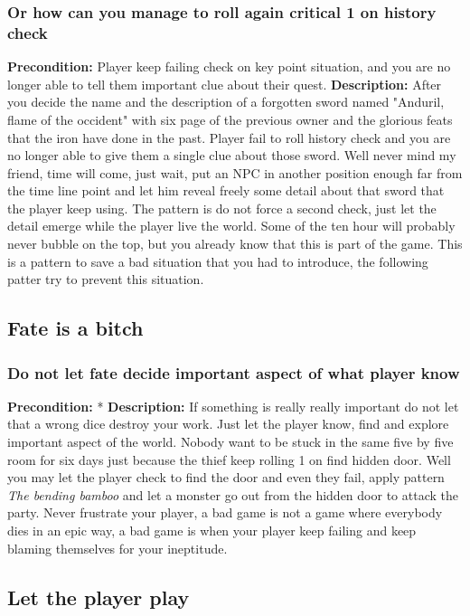 \documentclass[letterpaper,10pt,twoside,twocolumn,openany]{book}
\begin{document}
\subsubsection{Or how can you manage to roll again critical 1 on history check}
\textbf{Precondition:} Player keep failing check on key point situation, and you are no longer able to tell them important clue about their quest.
\newline
\noindent
\textbf{Description:} After you decide the name and the description of a forgotten sword named "Anduril, flame of the occident" with six page of the previous owner and the glorious feats that the iron have done in the past. Player fail to roll history check and you are no longer able to give them a single clue about those sword.
Well never mind my friend, time will come, just wait, put an NPC in another position enough far from the time line point and let him reveal freely some detail about that sword that the player keep using. The pattern is do not force a second check, just let the detail emerge while the player live the world. Some of the ten hour will probably never bubble on the top, but you already know that this is part of the game. This is a pattern to save a bad situation that you had to introduce, the following patter try to prevent this situation.


\subsection{Fate is a bitch}
\subsubsection{Do not let fate decide important aspect of what player know}
\textbf{Precondition:} *
\newline
\noindent
\textbf{Description:} If something is really really important do not let that a wrong dice destroy your work. Just let the player know, find and explore important aspect of the world.
Nobody want to be stuck in the same five by five room for six days just because the thief keep rolling 1 on find hidden door.
Well you may let the player check to find the door and even they fail, apply pattern \textit{The bending bamboo} and let a monster go out from the hidden door to attack the party.
Never frustrate your player, a bad game is not a game where everybody dies in an epic way, a bad game is when your player keep failing and keep blaming themselves for your ineptitude.

\subsection{Let the player play}
\end{document}
